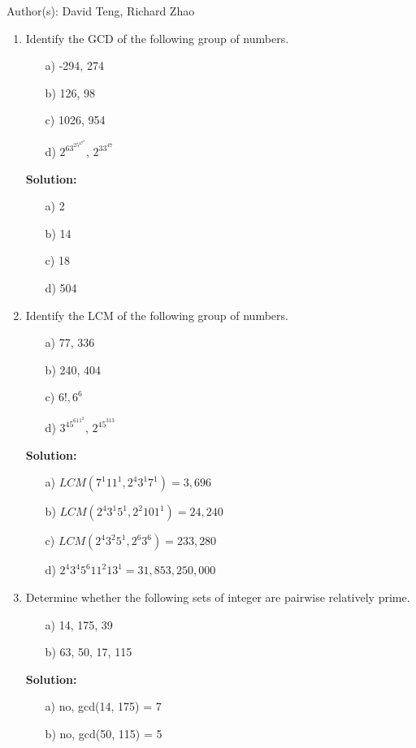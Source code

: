 \documentclass{article}
\newenvironment{solution}
{
\par
\color{blue}
\textbf{Solution:}
}
{
\par
}
\begin{document}
Author(s): David Teng, Richard Zhao
\newpage
\begin{enumerate}

\item Identify the GCD of the following group of numbers.
\begin{enumerate}
    \item[a)] -294, 274
    \item[b)] 126, 98
    \item[c)] 1026, 954
    \item[d)] $2^63^25^47^2$, $2^33^47$
\end{enumerate}
    \begin{solution}
    \begin{enumerate}
        \item[a)] 2
        \item[b)] 14
        \item[c)] 18
        \item[d)] 504
    \end{enumerate}
    \end{solution}

\item Identify the LCM of the following group of numbers.
\begin{enumerate}
    \item[a)] 77, 336
    \item[b)] 240, 404
    \item[c)] $6!, 6^6$
    \item[d)] $3^45^611^2$, $2^45^313$
\end{enumerate}
\begin{solution}
\begin{enumerate}
    \item[a)] $LCM(7^1 11^1, 2^4 3^1 7^1) = 3,696$
    \item[b)] $LCM(2^4 3^1 5^1, 2^2 101^1) = 24,240$
    \item[c)] $LCM(2^4 3^2 5^1, 2^6 3^6) = 233,280$
    \item[d)] $2^4 3^4 5^6 11^2 13^1 = 31,853,250,000$
\end{enumerate}
\end{solution}

\item Determine whether the following sets of integer are pairwise relatively prime.
\begin{enumerate}
    \item[a)] 14, 175, 39
    \item[b)] 63, 50, 17, 115
\end{enumerate}
\begin{solution}
\begin{enumerate}
    \item[a)] no, gcd(14, 175) = 7
    \item[b)] no, gcd(50, 115) = 5
\end{enumerate}
\end{solution}


\end{enumerate}
\end{document}
